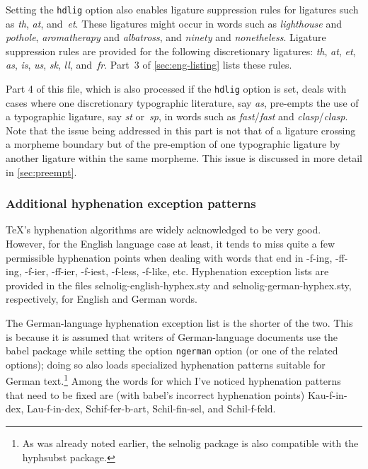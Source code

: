 \documentclass[12pt]{article}
\newcommand{\pkg}[1]{\textsf{#1}}
\newcommand{\opt}[1]{\texttt{#1}}
\begin{document}
Setting the \opt{hdlig} option also enables ligature suppression rules for ligatures such as \emph{th}, \emph{at}, and~\emph{et}. These ligatures might occur in words such as \emph{ligh\mbox{th}ouse} and \emph{po\mbox{th}ole}, \emph{arom\mbox{at}herapy} and \emph{alb\mbox{at}ross}, and \emph{nin\mbox{et}y} and \emph{non\mbox{et}heless}. Ligature suppression rules are provided for the following discretionary ligatures: \emph{th}, \emph{at}, \emph{et}, \emph{as}, \emph{is}, \emph{us}, {\ebg \emph{sk}},  \emph{ll}, and~\emph{fr}. Part~3 of \cref{sec:eng-listing} lists these rules.

Part 4 of this file, which is also processed if the \opt{hdlig} option is set, deals with cases where one discretionary typographic literature, say \emph{as}, pre-empts the use of a typographic ligature, say \emph{st} or~\emph{sp}, in words such as \emph{f\mbox{as}t}\slash \emph{fa\mbox{st}} and \emph{cl\mbox{as}p}\slash \emph{cla\mbox{sp}}. Note that the issue being addressed in this part is not that of a ligature crossing a morpheme boundary but of the pre-emption of one typographic ligature by another ligature within the same morpheme. This issue is discussed in more detail in \cref{sec:preempt}.



\subsubsection{Additional hyphenation exception patterns} \label{sec:addlhyph}

\TeX's hyphenation algorithms are widely acknowledged to be very good. However, for the English language case at least, it tends to miss quite a few permissible hyphenation points when dealing with words that end in -f-ing, -ff-ing, -f-ier, -ff-ier, -f-iest, -f-less, -f-like, etc. Hyphenation exception lists are provided in the files \pkg{selnolig-english-hyphex.sty} and \pkg{selnolig-german-hyphex.sty}, respectively, for English and German words.

The German-language hyphenation exception list is the shorter of the two. This is because it is assumed that writers of German-language documents use the \pkg{babel} package while setting the option \opt{ngerman} option (or one of the related options); doing so also loads specialized hyphenation patterns suitable for German text.\footnote{As was already noted earlier, the \pkg{selnolig} package is also compatible with the \pkg{hyphsubst} package.} Among the words for which I've noticed hyphenation patterns that need to be fixed are (with \pkg{babel}'s incorrect hyphenation points) Kau-f-in-dex, Lau-f-in-dex, Schif-fer-b-art, Schil-fin-sel, and Schil-f-feld.
\end{document}
